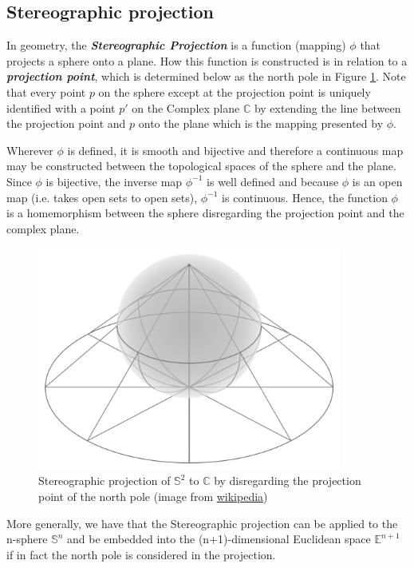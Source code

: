 \documentclass{article}
\theoremstyle{definition}
\newcommand{\CC}{\mathbb{C}}
\newcommand{\EE}{\mathbb{E}}
\renewcommand{\SS}{\mathbb{S}}
\newcommand{\newword}[1]{\textbf{\emph{#1}}}
\begin{document}
\subsection{Stereographic projection}
In geometry, the \newword{Stereographic Projection} is a function (mapping) $\phi$ that projects a sphere onto a plane. How this function is constructed is in relation to a \newword{projection point}, which is determined below as the north pole in Figure \ref{img:m1_steoregraphic_projection}. Note that every point $p$ on the sphere except at the projection point is uniquely identified with a point $p'$ on the Complex plane $\CC$ by extending the line between the projection point and $p$ onto the plane which is the mapping presented by $\phi$.

Wherever $\phi$ is defined, it is smooth and bijective and therefore a continuous map may be constructed between the topological spaces of the sphere and the plane. Since $\phi$ is bijective, the inverse map $\phi^{-1}$ is well defined and because $\phi$ is an open map (i.e. takes open sets to open sets), $\phi^{-1}$ is continuous. Hence, the function $\phi$ is a homemorphism between the sphere disregarding the projection point and the complex plane. 

\begin{figure}[H]
\centering
\includegraphics[width=10cm]{images/m1_stereographic_projection.png}
\caption{\small{Stereographic projection of $\SS^{2}$ to $\CC$} by disregarding the projection point of the north pole (image from \href{https://en.wikipedia.org/wiki/Stereographic_projection}{wikipedia})}
\label{img:m1_steoregraphic_projection}
\end{figure}

More generally, we have that the Stereographic projection can be applied to the n-sphere $\SS^{n}$ and be embedded into the (n+1)-dimensional Euclidean space $\EE^{n+1}$ if in fact the north pole is considered in the projection.
\end{document}

